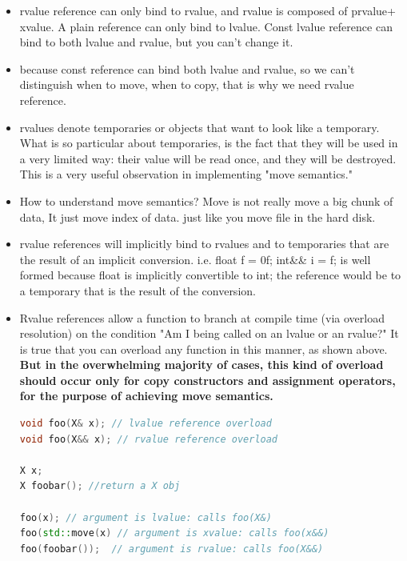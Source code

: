 \documentclass[a4paper,12pt,twoside]{book}
\begin{document}
\begin{itemize}

\item rvalue reference can only bind to rvalue, and rvalue is composed of prvalue+ xvalue. A plain  reference can only bind to lvalue. Const lvalue reference can bind to both lvalue and rvalue, but you can't change it.

\item because const reference can bind both lvalue and rvalue, so we can't distinguish when to move, when to copy, that is why we need rvalue reference. 

\item rvalues denote temporaries or objects that want to look like a temporary. What is so particular about temporaries, is the fact that they will be used in a very limited way: their value will be read once, and they will be destroyed. This is a very useful observation in implementing "move semantics." 

\item How to understand move semantics? Move is not really move a big chunk of data, It just move index of data. just like you move file in the hard disk. 

\item rvalue references will implicitly bind to rvalues and to temporaries that are the result of an implicit conversion. i.e. float f = 0f; int\&\& i = f; is well formed because float is implicitly convertible to int; the reference would be to a temporary that is the result of the conversion.


\item Rvalue references allow a function to branch at compile time (via overload resolution) on the condition "Am I being called on an lvalue or an rvalue?" It is true that you can overload any function in this manner, as shown above. \textbf{But in the overwhelming majority of cases, this kind of overload should occur only for copy constructors and assignment operators, for the purpose of achieving move semantics. }

\begin{lstlisting}[frame=single, language=c++]
void foo(X& x); // lvalue reference overload
void foo(X&& x); // rvalue reference overload

X x;
X foobar(); //return a X obj

foo(x); // argument is lvalue: calls foo(X&)
foo(std::move(x) // argument is xvalue: calls foo(x&&)
foo(foobar());  // argument is rvalue: calls foo(X&&)
\end{lstlisting}



\end{itemize}
\end{document}
